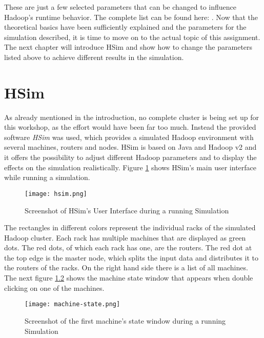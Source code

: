 These are just a few selected parameters that can be changed to influence Hadoop's runtime behavior. The complete list can be found here: \cite[see][]{AP03}. Now that the theoretical basics have been sufficiently explained and the parameters for the simulation described, it is time to move on to the actual topic of this assignment. The next chapter will introduce HSim and show how to change the parameters listed above to achieve different results in the simulation.
\chapter{HSim}
\label{hsim}
As already mentioned in the introduction, no complete cluster is being set up for this workshop, as the effort would have been far too much. Instead the provided software \textit{HSim} was used, which provides a simulated Hadoop environment with several machines, routers and nodes. HSim is based on Java and Hadoop v2 and it offers the possibility to adjust different Hadoop parameters and to display the effects on the simulation realistically. Figure \ref{hsim} shows HSim's main user interface while running a simulation.
\begin{figure}[H]
	\centering
	\texttt{[image: hsim.png]}
	\caption[Caption for LOF]{Screenshot of HSim's User Interface during a running Simulation}
	\label{hsim-pic}
\end{figure}
The rectangles in different colors represent the individual racks of the simulated Hadoop cluster. Each rack has multiple machines that are displayed as green dots. The red dots, of which each rack has one, are the routers. The red dot at the top edge is the master node, which splits the input data and distributes it to the routers of the racks. On the right hand side there is a list of all machines. The next figure \ref{machine-state} shows the machine state window that appears when double clicking on one of the machines.
\begin{figure}[H]
	\centering
	\texttt{[image: machine-state.png]}
	\caption[Caption for LOF]{Screenshot of the first machine's state window during a running Simulation}
	\label{machine-state}
\end{figure}
